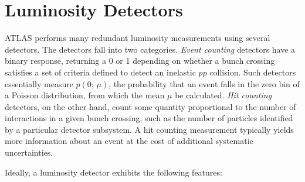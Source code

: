 \section{Luminosity Detectors}\label{sec:luminosity-detectors}
ATLAS performs many redundant luminosity measurements using several detectors. The detectors fall into two categories. \emph{Event counting} detectors have a binary response, returning a 0 or 1 depending on whether a bunch crossing satisfies a set of criteria defined to detect an inelastic $pp$ collision. Such detectors essentially measure $p(0;\,\mu)$, the probability that an event falls in the zero bin of a Poisson distribution, from which the mean $\mu$ be calculated. \emph{Hit counting} detectors, on the other hand, count some quantity proportional to the number of interactions in a given bunch crossing, such as the number of particles identified by a particular detector subsystem. A hit counting measurement typically yields more information about an event at the cost of additional systematic uncertainties.

Ideally, a luminosity detector exhibits the following features: 

